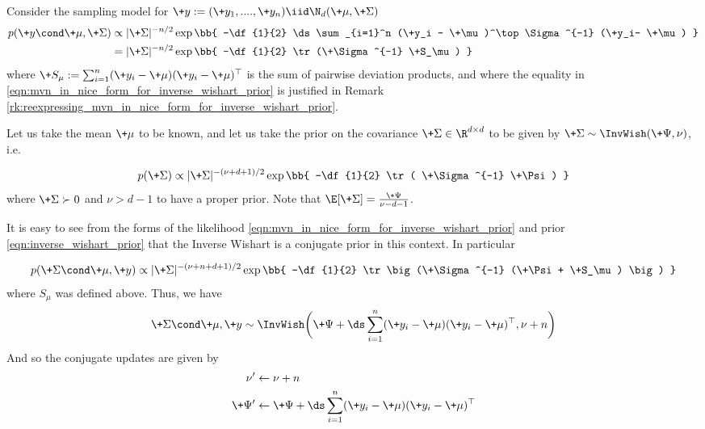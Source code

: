 \documentclass{article} %
\begin{document}
\begin{example}

Consider the sampling model for $\+y :=(\+y_1, ....,\+y_n) \iid \N_d(\+\mu,  \+\Sigma)$
\begin{align}
p(\+y \cond \+\mu, \+\Sigma) & \propto | \+\Sigma |^{-n/2} \exp \bb{ -\df{1}{2} \ds\sum_{i=1}^n (\+y_i - \+\mu)^\top  \Sigma^{-1} (\+y_i- \+\mu) } \nonumber \\
& = | \+\Sigma |^{-n/2} \exp \bb{ -\df{1}{2} \tr(\+\Sigma^{-1} \+S_\mu)  }\label{eqn:mvn_in_nice_form_for_inverse_wishart_prior}
\end{align}
where $\+S_\mu := \sum_{i=1}^n (\+y_i - \+\mu) (\+y_i - \+\mu)^\top$ is the sum of pairwise deviation products,  and where the equality in \eqref{eqn:mvn_in_nice_form_for_inverse_wishart_prior}  is justified in Remark \ref{rk:reexpressing_mvn_in_nice_form_for_inverse_wishart_prior}.

Let us take the mean $\+\mu$ to be known,  and let us take the prior on the covariance $\+\Sigma \in \R^{d \times d}$ to be given by $\+\Sigma \sim \InvWish(\+\Psi, \nu)$, i.e.

\begin{align}
p(\+\Sigma) \propto | \+\Sigma|^{-(\nu+d +1) /2}  \exp \bb{ -\df{1}{2} \tr ( \+\Sigma^{-1} \+\Psi) } 
\label{eqn:inverse_wishart_prior}
\end{align}
where $\+\Sigma \succ 0$ and $\nu > d-1$ to have a proper prior.   Note that $\E[\+\Sigma] = \frac{\+\Psi}{\nu -d -1}$.

It is easy to see from the forms of the likelihood \eqref{eqn:mvn_in_nice_form_for_inverse_wishart_prior} and prior \eqref{eqn:inverse_wishart_prior} that the Inverse Wishart is a conjugate prior in this context.  In particular

\begin{align}
p(\+\Sigma \cond \+\mu,  \+y) \propto | \+\Sigma|^{-(\nu+ n + d +1) /2}  \exp \bb{ -\df{1}{2} \tr \big(\+\Sigma^{-1} (\+\Psi + \+S_\mu) \big) } 
\label{eqn:inverse_wishart_posterior}
\end{align}
where $S_\mu$ was defined above.  Thus,  we have 
\[ \+\Sigma \cond \+\mu,  \+y \sim \InvWish \bigg( \+\Psi +  \ds\sum_{i=1}^n (\+y_i - \+\mu) (\+y_i - \+\mu)^\top,  \nu + n \bigg) \]
And so the conjugate updates are given by
\begin{align}
\nu^\prime &\leftarrow  \nu + n \\
\+\Psi^\prime &\leftarrow \+\Psi + \ds\sum_{i=1}^n (\+y_i - \+\mu) (\+y_i - \+\mu)^\top
\end{align}
\label{ex:inverse_wishart_prior}
\end{example}
\end{document}
